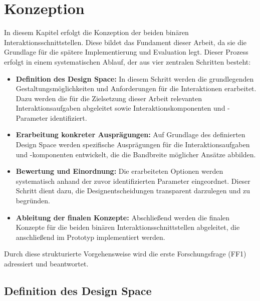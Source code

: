 \chapter{Konzeption}
\label{chap:Konzept}


In diesem Kapitel erfolgt die Konzeption der beiden binären Interaktionsschnittstellen. Diese bildet das Fundament dieser Arbeit, da sie die Grundlage für die spätere Implementierung und Evaluation legt. Dieser Prozess erfolgt in einem systematischen Ablauf, der aus vier zentralen Schritten besteht:

\begin{itemize}
    \item \textbf{Definition des Design Space:}
    In diesem Schritt werden die grundlegenden Gestaltungsmöglichkeiten und Anforderungen für die Interaktionen erarbeitet. Dazu werden die für die Zielsetzung dieser Arbeit relevanten Interaktionsaufgaben abgeleitet sowie Interaktionskomponenten und -Parameter identifiziert.
    \item \textbf{Erarbeitung konkreter Ausprägungen:}
    Auf Grundlage des definierten Design Space werden spezifische Ausprägungen für die Interaktionsaufgaben und -komponenten entwickelt, die die Bandbreite möglicher Ansätze abbilden.
    \item \textbf{Bewertung und Einordnung:}
    Die erarbeiteten Optionen werden systematisch anhand der zuvor identifizierten Parameter eingeordnet. Dieser Schritt dient dazu, die Designentscheidungen transparent darzulegen und zu begründen.
    \item \textbf{Ableitung der finalen Konzepte:}
    Abschließend werden die finalen Konzepte für die beiden binären Interaktionsschnittstellen abgeleitet, die anschließend im Prototyp implementiert werden.
\end{itemize}
 
Durch diese strukturierte Vorgehensweise wird die erste Forschungsfrage (FF1) adressiert und beantwortet.   

\section{Definition des Design Space}


